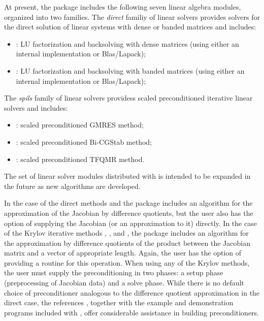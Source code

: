 At present, the package includes the following seven {\ida} linear algebra
modules, organized into two families. The {\em direct} familiy of linear
solvers provides solvers for the direct solution of linear systems with
dense or banded matrices and includes:
\begin{itemize} 
\item {\idadense}: LU factorization and backsolving with dense matrices
  (using either an internal implementation or Blas/Lapack); 
\item {\idaband}: LU factorization and backsolving with banded matrices
  (using either an internal implementation or Blas/Lapack); 
\end{itemize}
The {\em spils} family of linear solvers providess scaled preconditioned
iterative linear solvers and includes:
\begin{itemize} 
\item {\idaspgmr}: scaled preconditioned GMRES method;
\item {\idaspbcg}: scaled preconditioned Bi-CGStab method;
\item {\idasptfqmr}: scaled preconditioned TFQMR method.
\end{itemize}
The set of linear solver modules distributed with {\ida} is intended to be expanded in the
future as new algorithms are developed.

In the case of the direct methods {\idadense} and {\idaband}
the package includes an algorithm for the approximation of the Jacobian by difference
quotients, but the user also has the option of supplying the Jacobian
(or an approximation to it) directly. In the case of the Krylov iterative methods
{\idaspgmr}, {\idaspbcg}, and {\idasptfqmr}, the package includes an algorithm for
the approximation by difference quotients of the product between the Jacobian matrix
and a vector of appropriate length. Again, the user has the option of providing
a routine for this operation.
When  using any of the Krylov
methods, the user must supply the preconditioning in two phases: 
a setup phase (preprocessing of Jacobian data) and a solve phase.
While there is no default
choice of preconditioner analogous to the difference quotient
approximation in the direct case, the references
\cite{BrHi:89, Byr:92}, together with
the example and demonstration programs included with {\ida}, offer
considerable assistance in building preconditioners.

